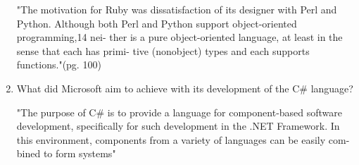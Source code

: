\begin{enumerate}
  \begin{answer}

    "The motivation for Ruby was dissatisfaction of its designer with Perl and Python. Although both Perl and Python support object-oriented programming,14 nei- ther is a pure object-oriented language, at least in the sense that each has primi- tive (nonobject) types and each supports functions."(pg. 100)

    \end{answer}

  \item What did Microsoft aim to achieve with its development of the
    C\# language?

  \begin{answer}

   "The purpose of C# is to provide a language for component-based software development, specifically for such development in the .NET Framework. In this environment, components from a variety of languages can be easily com- bined to form systems"

    \end{answer}

  \end{enumerate}


